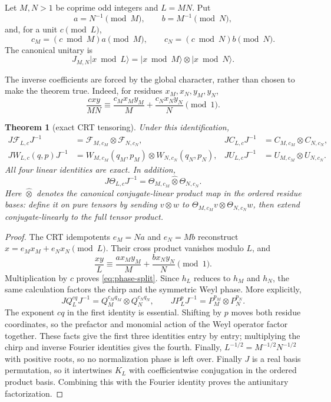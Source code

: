 \documentclass[11pt]{article}
\newtheorem{theorem}{Theorem}
\newcommand{\F}{\mathcal F}
\newcommand{\atensor}{\mathbin{\widehat{\otimes}}}
\begin{document}
Let $M,N>1$ be coprime odd integers and $L=MN$.  Put
\[
 a=N^{-1}\pmod M,\qquad b=M^{-1}\pmod N,
\]
and, for a unit $c\pmod L$,
\[
 c_M=(c\bmod M)a\pmod M,\qquad
 c_N=(c\bmod N)b\pmod N.
\]
The canonical unitary is
\[
 J_{M,N}|x\bmod L\rangle
 =|x\bmod M\rangle\otimes|x\bmod N\rangle.
\]

The inverse coefficients are forced by the global character, rather than
chosen to make the theorem true.  Indeed, for residues $x_M,x_N,y_M,y_N$,
\begin{equation}\label{eq:phase-split}
 \frac{cxy}{MN}\equiv
 \frac{c_Mx_My_M}{M}+\frac{c_Nx_Ny_N}{N}\pmod1.
\end{equation}

\begin{theorem}[exact CRT tensoring]\label{thm:crt}
Under this identification,
\begin{align*}
 J\F_{L,c}J^{-1}&=\F_{M,c_M}\otimes\F_{N,c_N},&
 JC_{L,c}J^{-1}&=C_{M,c_M}\otimes C_{N,c_N},\\
 JW_{L,c}(q,p)J^{-1}&=W_{M,c_M}(q_M,p_M)\otimes
 W_{N,c_N}(q_N,p_N),&
 JU_{L,c}J^{-1}&=U_{M,c_M}\otimes U_{N,c_N}.
\end{align*}
All four linear identities are exact.  In addition,
\[
 J\Theta_{L,c}J^{-1}
 =\Theta_{M,c_M}\atensor\Theta_{N,c_N}.
\]
Here $\atensor$ denotes the canonical conjugate-linear product map in the
ordered residue bases: define it on pure tensors by sending $v\otimes w$ to
$\Theta_{M,c_M}v\otimes\Theta_{N,c_N}w$, then extend conjugate-linearly to the
full tensor product.
\end{theorem}

\begin{proof}
The CRT idempotents $e_M=Na$ and $e_N=Mb$ reconstruct
$x=e_Mx_M+e_Nx_N\pmod L$.  Their cross product vanishes modulo $L$, and
\[
 \frac{xy}{L}\equiv\frac{a x_My_M}{M}+\frac{b x_Ny_N}{N}\pmod1.
\]
Multiplication by $c$ proves \eqref{eq:phase-split}.  Since $h_L$ reduces to
$h_M$ and $h_N$, the same calculation factors the chirp and the symmetric
Weyl phase.  More explicitly,
\[
 JQ_L^{cq}J^{-1}=Q_M^{c_Mq_M}\otimes Q_N^{c_Nq_N},\qquad
 JP_L^pJ^{-1}=P_M^{p_M}\otimes P_N^{p_N}.
\]
The exponent $cq$ in the first identity is essential.  Shifting by $p$ moves
both residue coordinates, so the prefactor and monomial action of the Weyl
operator factor together.  These facts give the first three identities entry
by entry; multiplying the chirp and inverse Fourier identities gives the
fourth.  Finally,
$L^{-1/2}=M^{-1/2}N^{-1/2}$ with positive roots, so no normalization phase is
left over.  Finally $J$ is a real basis permutation, so it intertwines $K_L$
with coefficientwise conjugation in the ordered product basis.  Combining
this with the Fourier identity proves the antiunitary factorization.
\end{proof}
\end{document}
